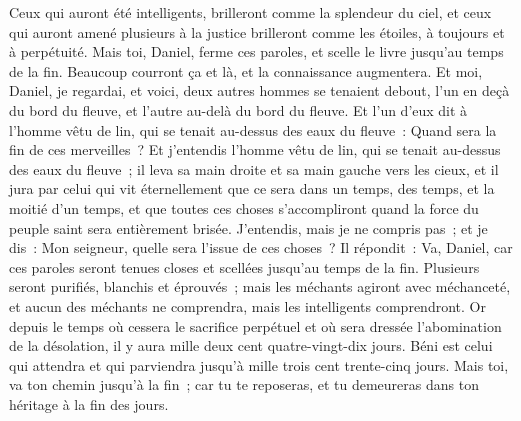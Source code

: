 \begin{multicols}{2}
Ceux qui auront été intelligents, brilleront comme la splendeur du ciel, et ceux qui auront amené plusieurs à la justice brilleront comme les étoiles, à toujours et à perpétuité.
Mais toi, Daniel, ferme ces paroles, et scelle le livre jusqu'au temps de la fin. Beaucoup courront ça et là, et la connaissance augmentera.
Et moi, Daniel, je regardai, et voici, deux autres hommes se tenaient debout, l'un en deçà du bord du fleuve, et l'autre au-delà du bord du fleuve.
Et l'un d'eux dit à l'homme vêtu de lin, qui se tenait au-dessus des eaux du fleuve~: Quand sera la fin de ces merveilles~?
Et j'entendis l'homme vêtu de lin, qui se tenait au-dessus des eaux du fleuve~; il leva sa main droite et sa main gauche vers les cieux, et il jura par celui qui vit éternellement que ce sera dans un temps, des temps, et la moitié d'un temps, et que toutes ces choses s'accompliront quand la force du peuple saint sera entièrement brisée.
J'entendis, mais je ne compris pas~; et je dis~: Mon seigneur, quelle sera l'issue de ces choses~?
Il répondit~: Va, Daniel, car ces paroles seront tenues closes et scellées jusqu'au temps de la fin.
Plusieurs seront purifiés, blanchis et éprouvés~; mais les méchants agiront avec méchanceté, et aucun des méchants ne comprendra, mais les intelligents comprendront.
Or depuis le temps où cessera le sacrifice perpétuel et où sera dressée l'abomination de la désolation, il y aura mille deux cent quatre-vingt-dix jours.
Béni est celui qui attendra et qui parviendra jusqu'à mille trois cent trente-cinq jours.
Mais toi, va ton chemin jusqu'à la fin~; car tu te reposeras, et tu demeureras dans ton héritage à la fin des jours.
\PPE{}
\end{multicols}
